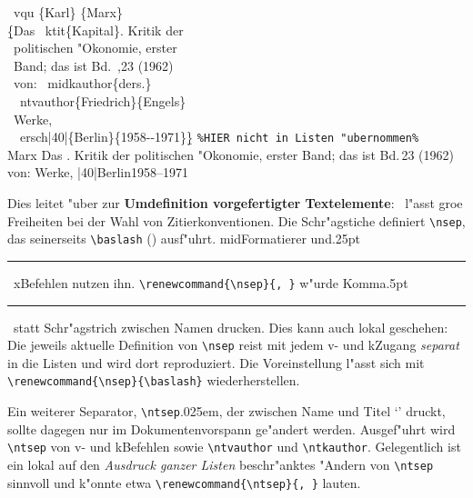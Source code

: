 \documentclass[12pt,a4paper]{article}
\newcommand{\pdfko}[1]{\kern #1pt
                              \rule[-0.4ex]{0.8pt}{0ex}\kern -0.8pt
                          \strut\ignorespaces}%
\newcommand{\pbs}{\string\ \unskip}
\newcommand{\bs}{\protect\pbs}
\begin{document}
\Doppelbox
{\vspace{.3em}
 \bs vqu \{Karl\} \{Marx\} 
 \\ \b{\{}Das \bs ktit\{Kapital\}. Kritik der 
 \\ \ politischen "Okonomie, erster 
 \\ \ Band; das ist Bd.\bs,23 (1962) 
 \\ \ von: \bs midkauthor\{ders.\} 
 \\ \ \bs ntvauthor\{Friedrich\}\{Engels\}
 \\ \ Werke, 
 \\ \ \bs ersch\string|40\string|\{Berlin\}\{1958-{}-1971\}\b{\}}
 \vspace{.2em}
}
{\footnotesize\notktitaddtok
 \texttt{\%HIER nicht in Listen "ubernommen\%}
 \\[.75ex]  {Marx} {Das . Kritik der politischen 
 "Okonomie, erster Band; das ist Bd.\,23 (1962) von: 
   
 Werke, 
 \ersch|40|{Berlin}{1958--1971}}
}\label{ntvauthor}%


\vspace{.5ex}\noindent 
Dies leitet "uber zur \textbf{Umdefinition vorgefertigter Textelemente}:
\BibArts\ l"asst gro\hyss e Freiheiten bei der Wahl von Zitierkonventionen. 
Die Schr"agstiche definiert \hspace{-.05em}\verb|\nsep|, \label{nsep1} das seinerseits 
\hspace{-.1em}\verb|\baslash| (\baslash) ausf"uhrt. mid\hy Formatierer und\pdfko{.25}\ 
x\fhy Befehlen nutzen ihn. \verb*|\renewcommand{\nsep}{, }|
\hspace{.1em}w"urde Komma\pdfko{.5}\ statt Schr"agstrich zwischen Namen drucken. Dies kann 
auch lokal geschehen: Die jeweils aktuelle Definition von \hspace{-.1em}\verb|\nsep| reist 
\label{Ausreise} mit jedem v- und k\fhy Zugang \textit{separat} in die Listen  
und wird dort reproduziert. Die Voreinstellung l"asst sich mit
\hspace{.05em}\verb|\renewcommand{\nsep}{\baslash}| \hspace{.075em}wiederherstellen.

Ein weiterer Separator, \hspace{-.1em}\verb|\ntsep|\kern.025em, \label{ntsepA} 
der zwischen Name und Titel `\textsf{\printntsep}' druckt,
sollte dagegen nur im Dokumentenvorspann ge"andert werden. 
Ausgef"uhrt wird \verb|\ntsep| von v- und k\fhy Befehlen 
sowie \verb|\ntvauthor| und \verb|\ntkauthor|. Gelegentlich 
ist ein lokal auf den \textit{Ausdruck ganzer Listen} 
beschr"anktes "Andern von \hspace{-.1em}\verb|\ntsep| 
sinnvoll und k"onnte etwa 
\verb*|\renewcommand{\ntsep}{, }|\hspace{.1em} lauten. 
\end{document}
